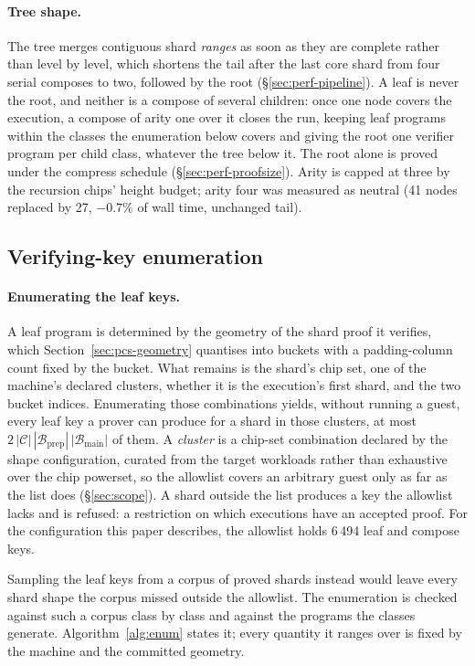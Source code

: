 \paragraph{Tree shape.} The tree merges contiguous shard \emph{ranges} as soon as they are complete rather than level by level, which shortens the tail after the last core shard from four serial composes to two, followed by the root (\S\ref{sec:perf-pipeline}). A leaf is never the root, and neither is a compose of several children: once one node covers the execution, a compose of arity one over it closes the run, keeping leaf programs within the classes the enumeration below covers and giving the root one verifier program per child class, whatever the tree below it. The root alone is proved under the compress schedule (\S\ref{sec:perf-proofsize}). Arity is capped at three by the recursion chips' height budget; arity four was measured as neutral (41 nodes replaced by 27, $-0.7\%$ of wall time, unchanged tail).

\subsection{Verifying-key enumeration}
\label{sec:recursion-key-enumeration}

\paragraph{Enumerating the leaf keys.} A leaf program is determined by the geometry of the shard proof it verifies, which Section~\ref{sec:pcs-geometry} quantises into buckets with a padding-column count fixed by the bucket. What remains is the shard's chip set, one of the machine's declared clusters, whether it is the execution's first shard, and the two bucket indices. Enumerating those combinations yields, without running a guest, every leaf key a prover can produce for a shard in those clusters, at most $2\,|\mathcal C|\,|\mathcal B_{\mathrm{prep}}|\,|\mathcal B_{\mathrm{main}}|$ of them. A \emph{cluster} is a chip-set combination declared by the shape configuration, curated from the target workloads rather than exhaustive over the chip powerset, so the allowlist covers an arbitrary guest only as far as the list does (\S\ref{sec:scope}). A shard outside the list produces a key the allowlist lacks and is refused: a restriction on which executions have an accepted proof. For the configuration this paper describes, the allowlist holds 6\,494 leaf and compose keys.

Sampling the leaf keys from a corpus of proved shards instead would leave every shard shape the corpus missed outside the allowlist. The enumeration is checked against such a corpus class by class and against the programs the classes generate. Algorithm~\ref{alg:enum} states it; every quantity it ranges over is fixed by the machine and the committed geometry.

